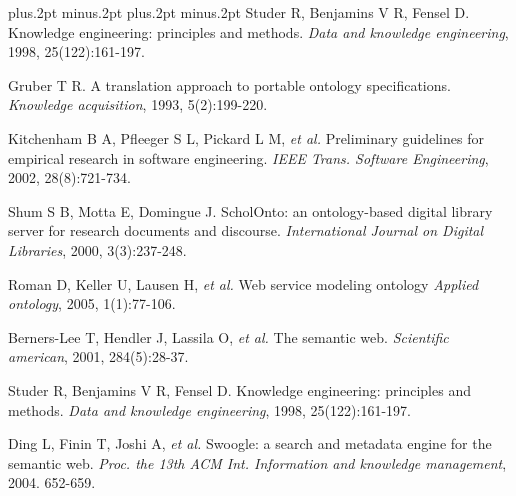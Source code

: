 \documentclass[twoside]{article}
\begin{document}
\vspace{2mm}

\begin{thebibliography}{99}
\footnotesize
\itemsep=-3pt plus.2pt minus.2pt
\baselineskip=13pt plus.2pt minus.2pt
Studer R, Benjamins V R, Fensel D. Knowledge engineering: principles and methods. {\it Data and knowledge engineering}, 1998, 25(122):161-197.

Gruber T R. A translation approach to portable ontology specifications. {\it Knowledge acquisition}, 1993, 5(2):199-220.

Kitchenham B A, Pfleeger S L, Pickard L M, {\it et al.} Preliminary guidelines for empirical research in software engineering. {\it IEEE Trans. Software Engineering}, 2002, 28(8):721-734.

Shum S B, Motta E, Domingue J. ScholOnto: an ontology-based digital library server for research documents and discourse. {\it International Journal on Digital Libraries}, 2000, 3(3):237-248.

Roman D, Keller U, Lausen H, {\it et al.} Web service modeling ontology {\it Applied ontology}, 2005, 1(1):77-106.

Berners-Lee T, Hendler J, Lassila O, {\it et al.} The semantic web. {\it Scientific american}, 2001, 284(5):28-37.

Studer R, Benjamins V R, Fensel D. Knowledge engineering: principles and methods. {\it Data and knowledge engineering}, 1998, 25(122):161-197.

Ding L, Finin T, Joshi A, {\it et al.} Swoogle: a search and metadata engine for the semantic web. {\it Proc. the 13th ACM Int. Information and knowledge management}, 2004. 652-659.


\end{thebibliography}
\end{document}
